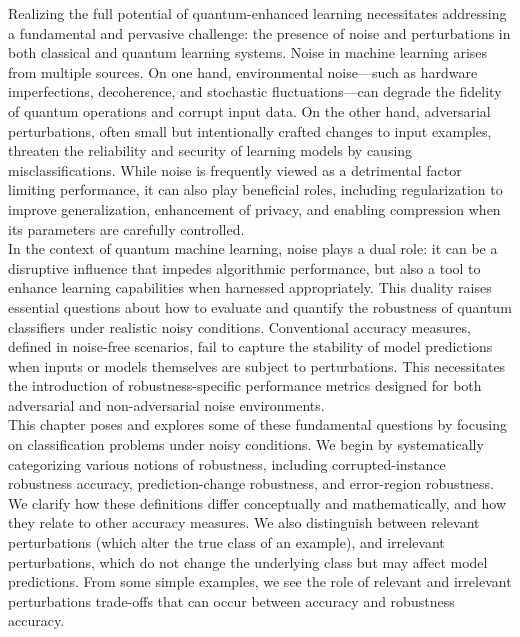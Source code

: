 \documentclass[onecolumn,prx, superscriptaddress,longbibliography,margin=1mm 11pt]{revtex4-2}
\begin{document}
Realizing the full potential of quantum-enhanced learning necessitates addressing a fundamental and pervasive challenge: the presence of noise and perturbations in both classical and quantum learning systems. Noise in machine learning arises from multiple sources. On one hand, environmental noise—such as hardware imperfections, decoherence, and stochastic fluctuations—can degrade the fidelity of quantum operations and corrupt input data. On the other hand, adversarial perturbations, often small but intentionally crafted changes to input examples, threaten the reliability and security of learning models by causing misclassifications. While noise is frequently viewed as a detrimental factor limiting performance, it can also play beneficial roles, including regularization to improve generalization, enhancement of privacy, and enabling compression when its parameters are carefully controlled.\\

In the context of quantum machine learning, noise plays a dual role: it can be a disruptive influence that impedes algorithmic performance, but also a tool to enhance learning capabilities when harnessed appropriately. This duality raises essential questions about how to evaluate and quantify the robustness of quantum classifiers under realistic noisy conditions. Conventional accuracy measures, defined in noise-free scenarios, fail to capture the stability of model predictions when inputs or models themselves are subject to perturbations. This necessitates the introduction of robustness-specific performance metrics designed for both adversarial and non-adversarial noise environments. \\

This chapter poses and explores some of these fundamental questions by focusing on classification problems under noisy conditions. We begin by systematically categorizing various notions of robustness, including corrupted-instance robustness accuracy, prediction-change robustness, and error-region robustness. We clarify how these definitions differ conceptually and mathematically, and how they relate to other accuracy measures. We also distinguish between relevant perturbations (which alter the true class of an example), and irrelevant perturbations, which do not change the underlying class but may affect model predictions. From some simple examples, we see the role of relevant and irrelevant perturbations trade-offs that can occur between accuracy and robustness accuracy.\\
\end{document}
